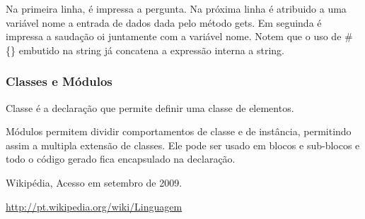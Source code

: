 \documentclass[12pt]{article}
\begin{document}
Na primeira linha, é impressa a pergunta. Na próxima linha é atribuido a uma variável nome a entrada de dados dada pelo método gets.
Em seguinda é impressa a saudação oi juntamente com a variável nome. Notem que o uso de \#\{\} embutido na string já concatena a expressão interna a string.

\subsubsection { Classes e Módulos }

Classe é a declaração que permite definir uma classe de elementos.

Módulos permitem dividir comportamentos de classe e de instância, permitindo assim a multipla extensão de classes. Ele pode ser usado em blocos e sub-blocos e todo o código gerado fica encapsulado na declaração. 









\begin{thebibliography}{9} 
Wikipédia, 
Acesso em setembro de 2009.

\url{http://pt.wikipedia.org/wiki/Linguagem}

\end{thebibliography} 
\end{document}
